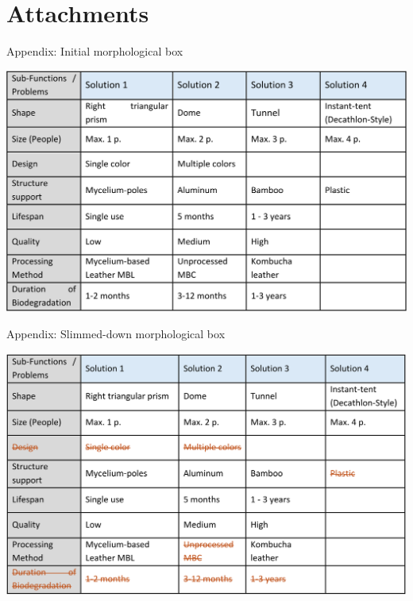 \documentclass{article}
\begin{document}
\newpage
\section{Attachments}
\pagestyle{fancy}
\begin{table}[ht!]
    \centering
    \caption{Appendix: Initial morphological box}
    \label{tab:initial_morph}
    \includegraphics[width=\textwidth]{media/initial_morph.png}
\end{table}

\vfill
\begin{table}[ht!]
    \centering
    \caption{Appendix: Slimmed-down morphological box}
    \label{tab:slimmed_morph}
    \includegraphics[width=\textwidth]{media/slimmed_morph.png}
\end{table}

\newpage
\pagestyle{empty}
\begin{figure}[ht!]
    \centering
    
    \label{pdf:tent-size}
\end{figure}
\addtocounter{figure}{+0}

\newpage
\begin{figure}[ht!]
    \centering
    
    \label{pdf:mockup-size}
\end{figure}
\addtocounter{figure}{+0}
\end{document}
